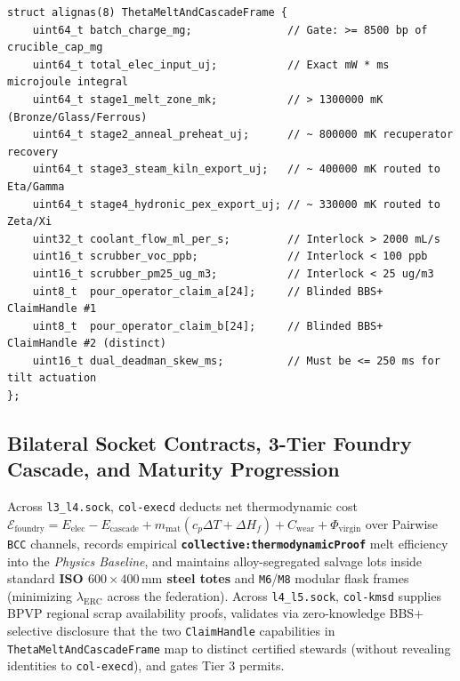 \begin{lstlisting}[caption={Scenario \texttt{Theta} Four-Stage Exergy Cascade \& Two-Person Molten-Pour Interlock Bytecode State},label={lst:theta-cascade}]
struct alignas(8) ThetaMeltAndCascadeFrame {
    uint64_t batch_charge_mg;               // Gate: >= 8500 bp of crucible_cap_mg
    uint64_t total_elec_input_uj;           // Exact mW * ms microjoule integral
    uint64_t stage1_melt_zone_mk;           // > 1300000 mK (Bronze/Glass/Ferrous)
    uint64_t stage2_anneal_preheat_uj;      // ~ 800000 mK recuperator recovery
    uint64_t stage3_steam_kiln_export_uj;   // ~ 400000 mK routed to Eta/Gamma
    uint64_t stage4_hydronic_pex_export_uj; // ~ 330000 mK routed to Zeta/Xi
    uint32_t coolant_flow_ml_per_s;         // Interlock > 2000 mL/s
    uint16_t scrubber_voc_ppb;              // Interlock < 100 ppb
    uint16_t scrubber_pm25_ug_m3;           // Interlock < 25 ug/m3
    uint8_t  pour_operator_claim_a[24];     // Blinded BBS+ ClaimHandle #1
    uint8_t  pour_operator_claim_b[24];     // Blinded BBS+ ClaimHandle #2 (distinct)
    uint16_t dual_deadman_skew_ms;          // Must be <= 250 ms for tilt actuation
};
\end{lstlisting}

\subsection{Bilateral Socket Contracts, 3-Tier Foundry Cascade, and Maturity Progression}

Across \texttt{l3\_l4.sock}, \texttt{col-execd} deducts net thermodynamic cost
$\mathcal{E}_{\mathrm{foundry}} = E_{\mathrm{elec}} - E_{\mathrm{cascade}} + m_{\mathrm{mat}}(c_p\Delta T + \Delta H_f) + C_{\mathrm{wear}} + \Phi_{\mathrm{virgin}}$
over Pairwise \texttt{BCC} channels, records empirical \textbf{\texttt{collective:thermodynamicProof}} melt efficiency into the \textit{Physics
Baseline}, and maintains alloy-segregated salvage lots inside standard \textbf{ISO $600\times 400\,\mathrm{mm}$ steel totes} and \texttt{M6}/\texttt{M8}
modular flask frames (minimizing $\lambda_{\mathrm{ERC}}$ across the federation). Across \texttt{l4\_l5.sock}, \texttt{col-kmsd} supplies BPVP
regional scrap availability proofs, validates via zero-knowledge BBS+ selective disclosure \parencite{camenisch2004signature} that the two
\texttt{ClaimHandle} capabilities in \texttt{ThetaMeltAndCascadeFrame} map to distinct certified stewards (without revealing identities to
\texttt{col-execd}), and gates Tier 3 permits.

